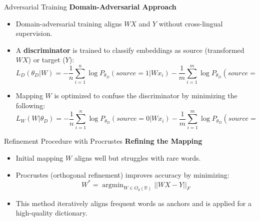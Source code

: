 \documentclass[final]{beamer}
\newlength{\onecolwid}
\DeclareMathOperator*{\argmin}{argmin}
\newcommand{\longeqsize}{\fontsize{20.5}{26}\selectfont}
\begin{document}
\begin{frame}[t]
\begin{columns}[t]
\begin{column}{\onecolwid}



\begin{block}{Adversarial Training}
    \textbf{Domain-Adversarial Approach}
    \begin{itemize}
        \item Domain-adversarial training aligns \( WX \) and \( Y \) without cross-lingual supervision.
        \item A \textbf{discriminator} is trained to classify embeddings as source (transformed \( WX \)) or target (\( Y \)):
        \longeqsize
        \begin{equation}
            L_D(\theta_D | W) = - \frac{1}{n} \sum_{i=1}^n \log P_{\theta_D}(source = 1 | W x_i) - \frac{1}{m} \sum_{i=1}^m \log P_{\theta_D}(source = 0 | y_i)
        \end{equation}
        \normalsize
        \item Mapping \( W \) is optimized to confuse the discriminator by minimizing the following:
        \longeqsize
        \begin{equation}
            L_W(W | \theta_D) = - \frac{1}{n} \sum_{i=1}^n \log P_{\theta_D}(source = 0 | W x_i) - \frac{1}{m} \sum_{i=1}^m \log P_{\theta_D}(source = 1 | y_i)
        \end{equation}
        \normalsize
    \end{itemize}
\end{block}

\begin{block}{Refinement Procedure with Procrustes}
    \textbf{Refining the Mapping}
    \begin{itemize}
        \item Initial mapping \( W \) aligns well but struggles with rare words.
        \item Procrustes (orthogonal refinement) improves accuracy by minimizing:
        \begin{equation}
            W^* = \argmin_{W \in O_d(\mathbb{R})} || W X - Y ||_F
        \end{equation}
        \item This method iteratively aligns frequent words as anchors and is applied for a high-quality dictionary.
    \end{itemize}
\end{block}


\end{column}
\end{columns}
\end{frame}
\end{document}
